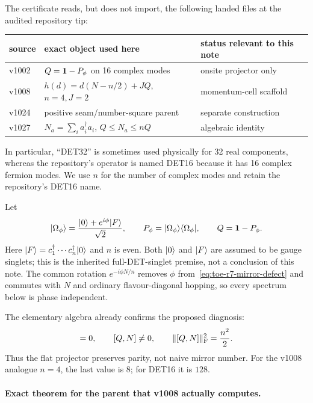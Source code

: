 The certificate reads, but does not import, the following landed files at the
audited repository tip:
\begin{center}
\begin{tabular}{lll}
\toprule
source & exact object used here & status relevant to this note\\
\midrule
v1002 & $Q=\mathbf 1-P_\phi$ on 16 complex modes & onsite projector only\\
v1008 & $h(d)=d(N-n/2)+JQ$, $n=4,J=2$ & momentum-cell scaffold\\
v1024 & positive seam/number-square parent & separate construction\\
v1027 & $N_a=\sum_i a_i^\dagger a_i$, $Q\leq N_a\leq nQ$ & algebraic identity\\
\bottomrule
\end{tabular}
\end{center}
In particular, ``DET32'' is sometimes used physically for 32 real components,
whereas the repository's operator is named DET16 because it has 16 complex
fermion modes.  We use $n$ for the number of complex modes and retain the
repository's DET16 name.

Let
\begin{equation}
 |\Omega_\phi\rangle=\frac{|0\rangle+e^{i\phi}|F\rangle}{\sqrt2},\qquad
 P_\phi=|\Omega_\phi\rangle\langle\Omega_\phi|,\qquad Q=\mathbf 1-P_\phi.
 \label{eq:toe-r7-mirror-defect}
\end{equation}
Here $|F\rangle=c_1^\dagger\cdots c_n^\dagger|0\rangle$ and $n$ is even.  Both
$|0\rangle$ and $|F\rangle$ are assumed to be gauge singlets; this is the inherited
full-DET-singlet premise, not a conclusion of this note.  The common rotation
$e^{-i\phi N/n}$ removes $\phi$ from~\eqref{eq:toe-r7-mirror-defect} and commutes with $N$ and
ordinary flavour-diagonal hopping, so every spectrum below is phase independent.

The elementary algebra already confirms the proposed diagnosis:
\begin{equation}
 [Q,(-1)^N]=0,
 \qquad [Q,N]\neq0,
 \qquad \|[Q,N]\|_{\rm F}^2=\frac{n^2}{2}.
 \label{eq:toe-r7-mirror-paritynotnumber}
\end{equation}
Thus the flat projector preserves parity, not naive mirror number.  For the
v1008 analogue $n=4$, the last value is $8$; for DET16 it is $128$.

\paragraph{Exact theorem for the parent that v1008 actually computes.}

